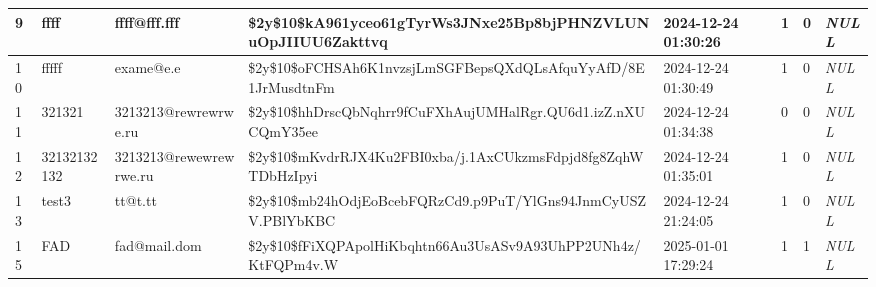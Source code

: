\begin{longtable}{|l|l|l|l|l|l|l|l|}
9 & ffff & ffff@fff.fff & \$2y\$10\$kA961yceo61gTyrWs3JNxe25Bp8bjPHNZVLUNuOpJIIUU6Zakttvq & 2024-12-24 01:30:26 & 1 & 0 & \textit{NULL} \\ \hline 
10 & fffff & exame@e.e & \$2y\$10\$oFCHSAh6K1nvzsjLmSGFBepsQXdQLsAfquYyAfD/8E1JrMusdtnFm & 2024-12-24 01:30:49 & 1 & 0 & \textit{NULL} \\ \hline 
11 & 321321 & 3213213@rewrewrwe.ru & \$2y\$10\$hhDrscQbNqhrr9fCuFXhAujUMHalRgr.QU6d1.izZ.nXUCQmY35ee & 2024-12-24 01:34:38 & 0 & 0 & \textit{NULL} \\ \hline 
12 & 32132132132 & 3213213@rewewrewrwe.ru & \$2y\$10\$mKvdrRJX4Ku2FBI0xba/j.1AxCUkzmsFdpjd8fg8ZqhWTDbHzIpyi & 2024-12-24 01:35:01 & 1 & 0 & \textit{NULL} \\ \hline 
13 & test3 & tt@t.tt & \$2y\$10\$mb24hOdjEoBcebFQRzCd9.p9PuT/YlGns94JnmCyUSZV.PBlYbKBC & 2024-12-24 21:24:05 & 1 & 0 & \textit{NULL} \\ \hline 
15 & FAD & fad@mail.dom & \$2y\$10\$fFiXQPApolHiKbqhtn66Au3UsASv9A93UhPP2UNh4z/KtFQPm4v.W & 2025-01-01 17:29:24 & 1 & 1 & \textit{NULL} \\ \hline 
 \end{longtable}
